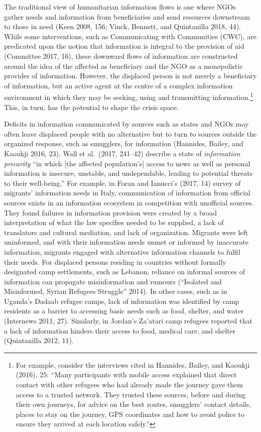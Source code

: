\documentclass[
]{article}
\begin{document}
The traditional view of humanitarian information flows is one where NGOs
gather needs and information from beneficiaries and send resources
downstream to those in need (Keen 2008, 156; Vinck, Bennett, and
Quintanilla 2018, 44). While some interventions, such as Communicating
with Communities (CWC), are predicated upon the notion that information
is integral to the provision of aid (Committee 2017, 16), these downward
flows of information are constructed around the idea of the affected as
beneficiary and the NGO as a monopolistic provider of information.
However, the displaced person is not merely a beneficiary of
information, but an active agent at the centre of a complex information
environment in which they may be seeking, using and transmitting
information.\footnote{For example, consider the interviews cited in
  Hannides, Bailey, and Kaoukji (2016), 25: ``Many participants with
  mobile access explained that direct contact with other refugees who
  had already made the journey gave them access to a trusted network.
  They trusted these sources, before and during their own journeys, for
  advice on the best routes, smugglers' contact details, places to stay
  on the journey, GPS coordinates and how to avoid police to ensure they
  arrived at each location safely.''} This, in turn, has the potential
to shape the crisis space.

Deficits in information communicated by sources such as states and NGOs
may often leave displaced people with no alternative but to turn to
sources outside the organized response, such as smugglers, for
information (Hannides, Bailey, and Kaoukji 2016, 23). Wall et al.~(2017,
241--42) describe a state of \emph{information precarity} ``in which
{[}the affected population's{]} access to news as well as personal
information is insecure, unstable, and undependable, leading to
potential threats to their well-being.'' For example, in Foran and
Ianucci's (2017, 14) survey of migrants' information needs in Italy,
communication of information from official sources exists in an
information ecosystem in competition with unofficial sources. They found
failures in information provision were created by a broad interpretation
of what the law specifies needed to be supplied, a lack of translators
and cultural mediation, and lack of organization. Migrants were left
uninformed, and with their information needs unmet or informed by
inaccurate information, migrants engaged with alternative information
channels to fulfil their needs. For displaced persons residing in
countries without formally designated camp settlements, such as Lebanon,
reliance on informal sources of information can propagate misinformation
and rumours (``Isolated and Misinformed, Syrian Refugees Struggle''
2014). In other cases, such as in Uganda's Dadaab refugee camps, lack of
information was identified by camp residents as a barrier to accessing
basic needs such as food, shelter, and water (Internews 2011, 27).
Similarly, in Jordan's Za'atari camp refugees reported that a lack of
information hinders their access to food, medical care, and shelter
(Quintanilla 2012, 11).
\end{document}
